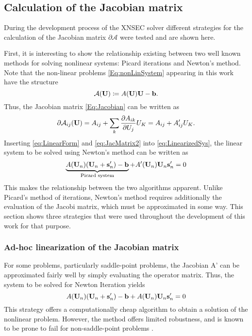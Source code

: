 \subsection{Calculation of the Jacobian matrix} \label{ssec:EvalJacobian}
During the development process of the XNSEC solver different strategies for the calculation of the Jacobian matrix $\partial \mathcal{A}$ were tested and are shown here. 

First, it is interesting to show the relationship existing between two well known methods for solving nonlinear systems: Picard iterations and Newton's method. Note that the non-linear problems \cref{Eq:nonLinSystem} appearing in this work have the structure
\begin{equation}
	\mathcal{A}(\textbf{U}) \coloneqq  A(\textbf{U})\textbf{U}-\textbf{b}. \label{eq:LinearForm}
\end{equation}
Thus, the Jacobian matrix \cref{Eq:Jacobian} can be written as
\begin{equation}
	\partial \mathcal{A}_{ij}(\textbf{U})  = A_{ij} + \sum_k \frac{\partial A_{ik}}{\partial U_j} U_K = A_{ij} + A'_{ij}U_K.\label{eq:JacMatrix2}
\end{equation}
Inserting \cref{eq:LinearForm} and  \cref{eq:JacMatrix2} into \cref{eq:LinearizedSys}, the linear system to be solved using Newton's method can be written as
\begin{equation}
	\underbrace{A(\textbf{U}_n)(\textbf{U}_n+\textbf{s}'_n) - \textbf{b}}_{\text{Picard system}} + A'(\textbf{U}_n)\textbf{U}_n\textbf{s}'_n = 0
\end{equation}
This makes the relationship between the two algorithms apparent. Unlike Picard's method of iterations, Newton's method requires additionally the evaluation of the Jacobi matrix, which must be approximated in some way. This section shows three strategies that were used throughout the development of this work for that purpose.

\subsubsection{Ad-hoc linearization of the Jacobian matrix}
For some problems, particularly saddle-point problems, the Jacobian A' can be approximated fairly well by simply evaluating the operator matrix. Thus, the system to be solved for Newton Iteration yields
\begin{equation}
	A(\textbf{U}_n)(\textbf{U}_n+\textbf{s}'_n) - \textbf{b} + A(\textbf{U}_n)\textbf{U}_n\textbf{s}'_n = 0
\end{equation}
This strategy offers a computationally cheap algorithm to obtain a solution of the nonlinear problem. However, the method offers limited robustness, and is known to be prone to fail for non-saddle-point problems \parencite{kikkerHighOrderEXtendedDiscontinuous2020}. 

